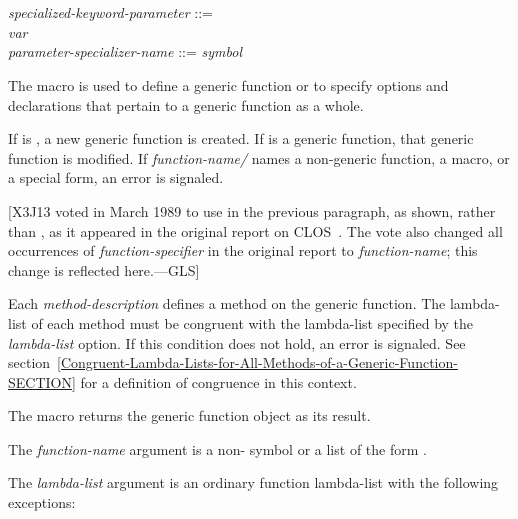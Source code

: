 \begin{defmac}
\begin{tabbing}
\> \\
\>\cd{)} \poptabs \\[2pt]
{\it specialized-keyword-parameter\/} ::= \\
\hskip 2pc {\it var} {\Mor} \cd{(}
       \cd{)} \\[2pt]
{\it parameter-specializer-name\/} ::= {\it symbol} {\Mor} 
\end{tabbing}
The macro  is used to define a generic function or to
specify options and declarations that pertain to a generic function as
a whole.

If  is , a new
generic function is created.  If  is a generic function, that generic function
is modified.  If {\it function-name/} names a non-generic
function, a macro, or a special form, an error is signaled.

[X3J13 voted in March 1989  to use 
in the previous paragraph, as shown, rather than ,
as it appeared in the original report on CLOS~\cite{SIGPLAN-CLOS,LASC-CLOS-PART-2}.
The vote also changed all occurrences of {\it function-specifier} in the
original report to {\it function-name}; this change is reflected here.---GLS]

Each {\it method-description\/} defines a method on the generic function.
The lambda-list of each method must be congruent with the lambda-list
specified by the {\it lambda-list\/} option.  If this condition
does not hold, an error is signaled.
See section~\ref{Congruent-Lambda-Lists-for-All-Methods-of-a-Generic-Function-SECTION}
for a definition
of congruence in this context.

The macro  returns the generic function object 
as its result.




The {\it function-name} argument is a non- symbol or a
list of the form .


The {\it lambda-list\/} argument is an ordinary function lambda-list
with the following exceptions:


\end{defmac}
